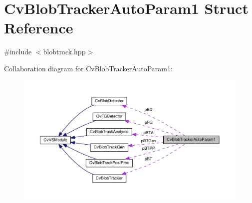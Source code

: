 \hypertarget{structCvBlobTrackerAutoParam1}{\section{Cv\-Blob\-Tracker\-Auto\-Param1 Struct Reference}
\label{structCvBlobTrackerAutoParam1}
}


{\ttfamily \#include $<$blobtrack.\-hpp$>$}



Collaboration diagram for Cv\-Blob\-Tracker\-Auto\-Param1\-:\nopagebreak
\begin{figure}[H]
\begin{center}
\leavevmode
\includegraphics[width=350pt]{structCvBlobTrackerAutoParam1__coll__graph}
\end{center}
\end{figure}
